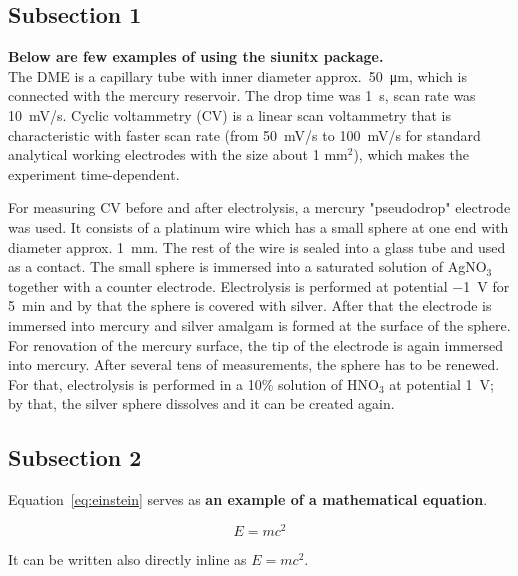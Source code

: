 \subsection{Subsection 1}
\label{sec:subsection_exp_1}

\textbf{Below are few examples of using the siunitx package.}\\

The DME is a capillary tube with inner diameter approx.~\SI{50}{\micro\meter}, which is connected with the mercury reservoir. The drop time was \SI{1}{\second}, scan rate was \SI{10}{\mV/\second}. Cyclic voltammetry (CV) is a linear scan voltammetry that is characteristic with faster scan rate (from \SI{50}{\mV/\second} to \SI{100}{\mV/\second} for standard analytical working electrodes with the size about 1 mm$^2$), which makes the experiment time-dependent.\cite{Bard}  

For measuring CV before and after electrolysis, a mercury "pseudodrop" electrode was used. It consists of a platinum wire which has a small sphere at one end with diameter approx. \SI{1}{\milli\meter}. The rest of the wire is sealed into a glass tube and used as a contact. The small sphere is immersed into a saturated solution of AgNO$_3$ together with a counter electrode. Electrolysis is performed at potential \SI{-1}{\volt} for \SI{5}{\minute} and by that the sphere is covered with silver. After that the electrode is immersed into mercury and silver amalgam is formed at the surface of the sphere. For renovation of the mercury surface, the tip of the electrode is again immersed into mercury. After several tens of measurements, the sphere has to be renewed. For that, electrolysis is performed in a 10\% solution of HNO$_3$ at potential \SI{1}{\volt}; by that, the silver sphere dissolves and it can be created again.

\subsection{Subsection 2}
\label{sec:subsection_exp_2}

Equation~\ref{eq:einstein} serves as \textbf{an example of a mathematical equation}.

\begin{equation}
E = mc^2
\label{eq:einstein}
\end{equation}

\noindent
It can be written also directly inline as \(E=mc^2\).